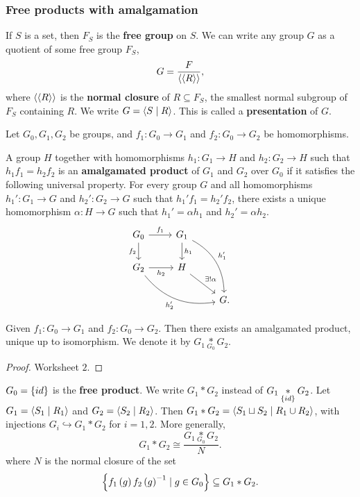 \subsubsection{Free products with amalgamation}

\begin{definition*}
If $ S $ is a set, then $ F_S $ is the \textbf{free group} on $ S $. We can write any group $ G $ as a quotient of some free group $ F_S $,
$$ G = \dfrac{F}{\left\langle \left\langle R \right\rangle \right\rangle}, $$
where $ \left\langle \left\langle R \right\rangle \right\rangle $ is the \textbf{normal closure} of $ R \subseteq F_S $, the smallest normal subgroup of $ F_S $ containing $ R $. We write $ G = \left\langle S \mid R \right\rangle $. This is called a \textbf{presentation} of $ G $.
\end{definition*}

Let $ G_0, G_1, G_2 $ be groups, and $ f_1 : G_0 \to G_1 $ and $ f_2 : G_0 \to G_2 $ be homomorphisms.

\begin{definition*}
A group $ H $ together with homomorphisms $ h_1 : G_1 \to H $ and $ h_2 : G_2 \to H $ such that $ h_1f_1 = h_2f_2 $ is an \textbf{amalgamated product} of $ G_1 $ and $ G_2 $ over $ G_0 $ if it satisfies the following universal property. For every group $ G $ and all homomorphisms $ h_1' : G_1 \to G $ and $ h_2' : G_2 \to G $ such that $ h_1'f_1 = h_2'f_2 $, there exists a unique homomorphism $ \alpha : H \to G $ such that $ h_1' = \alpha h_1 $ and $ h_2' = \alpha h_2 $.
$$
\begin{tikzcd}
G_0 \arrow{r}{f_1} \arrow[swap]{d}{f_2} & G_1 \arrow{d}{h_1} \arrow[bend left=30]{ddr}{h_1'} & \\
G_2 \arrow[swap]{r}{h_2} \arrow[bend right=30, swap]{drr}{h_2'} & H \arrow{dr}{\exists !\alpha} & \\
& & G.
\end{tikzcd}
$$
\end{definition*}

\begin{theorem}
Given $ f_1 : G_0 \to G_1 $ and $ f_2 : G_0 \to G_2 $. Then there exists an amalgamated product, unique up to isomorphism. We denote it by
$ G_1 \underset{G_0}{*} G_2 $.
\end{theorem}

\begin{proof}
Worksheet $ 2 $.
\end{proof}


$ G_0 = \left\{ id \right\} $ is the \textbf{free product}. We write $ G_1 * G_2 $ instead of $ G_1 \underset{\left\{ id \right\}}{*} G_2 $. Let $ G_1 = \left\langle S_1 \mid R_1 \right\rangle $ and $ G_2 = \left\langle S_2 \mid R_2 \right\rangle $. Then $ G_1 * G_2 = \left\langle S_1 \sqcup S_2 \mid R_1 \cup R_2 \right\rangle $, with injections $ G_i \hookrightarrow G_1 * G_2 $ for $ i = 1, 2 $. More generally,
$$ G_1 * G_2 \cong \dfrac{G_1 \underset{G_0}{*} G_2}{N}. $$
where $ N $ is the normal closure of the set
$$ \left\{ f_1\left( g \right)f_2\left( g \right)^{-1} \mid g \in G_0 \right\} \subseteq G_1 * G_2. $$

